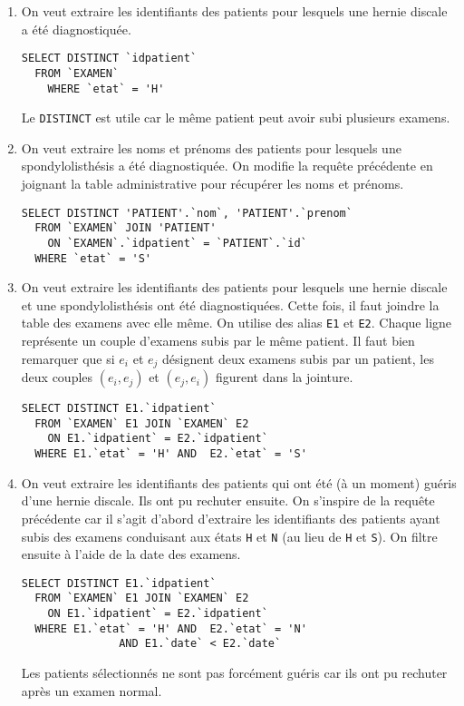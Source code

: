 \begin{enumerate}
 \item On veut extraire les identifiants des patients pour lesquels une hernie discale a été diagnostiquée.
\begin{verbatim}
SELECT DISTINCT `idpatient` 
  FROM `EXAMEN` 
    WHERE `etat` = 'H'  
\end{verbatim} 
Le \texttt{DISTINCT} est utile car le même patient peut avoir subi plusieurs examens.

\item On veut extraire les noms et prénoms des patients pour lesquels une spondylolisthésis a été diagnostiquée.\newline
On modifie la requête précédente en joignant la table administrative pour récupérer les noms et prénoms.
\begin{verbatim}
SELECT DISTINCT 'PATIENT'.`nom`, 'PATIENT'.`prenom` 
  FROM `EXAMEN` JOIN 'PATIENT' 
    ON `EXAMEN`.`idpatient` = `PATIENT`.`id`
  WHERE `etat` = 'S'  
\end{verbatim} 

 \item On veut extraire les identifiants des patients pour lesquels une hernie discale et une spondylolisthésis ont été diagnostiquées.\newline
 Cette fois, il faut joindre la table des examens avec elle même. On utilise des alias \texttt{E1} et \texttt{E2}. Chaque ligne représente un couple d'examens subis par le même patient. Il faut bien remarquer que si $e_i$ et $e_j$ désignent deux examens subis par un patient, les deux couples $(e_i,e_j)$ et $(e_j,e_i)$ figurent dans la jointure.
\begin{verbatim}
SELECT DISTINCT E1.`idpatient` 
  FROM `EXAMEN` E1 JOIN `EXAMEN` E2 
    ON E1.`idpatient` = E2.`idpatient`
  WHERE E1.`etat` = 'H' AND  E2.`etat` = 'S' 
\end{verbatim} 
 
 \item On veut extraire les identifiants des patients qui ont été (à un moment) guéris d'une hernie discale. Ils ont pu rechuter ensuite.\newline
 On s'inspire de la requête précédente car il s'agit d'abord d'extraire les identifiants des patients ayant subis des examens conduisant aux états \texttt{H} et \texttt{N} (au lieu de \texttt{H} et \texttt{S}).  On filtre ensuite à l'aide de la date des examens. 
\begin{verbatim}
SELECT DISTINCT E1.`idpatient` 
  FROM `EXAMEN` E1 JOIN `EXAMEN` E2 
    ON E1.`idpatient` = E2.`idpatient`
  WHERE E1.`etat` = 'H' AND  E2.`etat` = 'N' 
               AND E1.`date` < E2.`date` 
\end{verbatim} 
Les patients sélectionnés ne sont pas forcément guéris car ils ont pu rechuter après un examen normal.
\end{enumerate}
